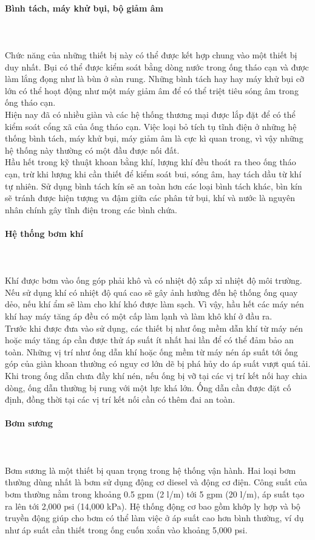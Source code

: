 \documentclass[12pt,a4paper]{article}
\newcommand{\subsubsubsection}[1]{\paragraph{#1}\mbox{}\\}
\begin{document}
\subsubsubsection{Bình tách, máy khử bụi, bộ giảm âm}\\
	Chức năng của những thiết bị này có thể được kết hợp chung vào một thiết bị duy nhất. Bụi có thể được kiểm soát bằng dòng nước trong ống tháo cạn và được làm lắng đọng như là bùn ở sàn rung. Những bình tách hay hay máy khử bụi cỡ lớn có thể hoạt động như một máy giảm âm để có thể triệt tiêu sóng âm trong ống tháo cạn.\\
	Hiện nay đã có nhiều giàn và các hệ thống thương mại được lắp đặt để có thể kiểm soát cổng xã của ống tháo cạn. Việc loại bỏ tích tụ tĩnh điện ở những hệ thống bình tách, máy khử bụi, máy giảm âm là cực kì quan trong, vì vậy những hệ thống này thường có một đầu được nối đất.\\
	Hầu hết trong kỹ thuật khoan bằng khí, lượng khí đều thoát ra theo ống tháo cạn, trừ khi lượng khi cần thiết để kiểm soát bui, sóng âm, hay tách dầu từ khí tự nhiên. Sử dụng bình tách kín sẽ an toàn hơn các loại bình tách khác, bìn kín sẽ tránh được hiện tượng va đậm giữa các phân tử bụi, khí và nước là nguyên nhân chính gây tĩnh điện trong các bình chứa.
\subsubsubsection{Hệ thống bơm khí}\\
	Khí được bơm vào ống góp phải khô và có nhiệt độ xấp xỉ nhiệt độ môi trường. Nếu sử dụng khí có nhiệt độ quá cao sẽ gây ảnh hưởng đến hệ thống ống quay dẻo, nếu khí ẩm sẽ làm cho khí khó được làm sạch. Vì vậy, hầu hết các máy nén khí hay máy tăng áp đều có một cấp làm lạnh và làm khô khí ở đầu ra.\\
	Trước khi được đưa vào sử dụng, các thiết bị như ống mềm dẫn khí từ máy nén hoặc máy tăng áp cần được thử áp suất ít nhất hai lần để có thể đảm bảo an toàn. Những vị trí như ống dẫn khí hoặc ống mềm từ máy nén áp suất tới ống góp của giàn khoan thường có nguy cơ lớn dẽ bị phá hủy do áp suất vượt quá tải. Khi trong ống dẫn chưa đầy khí nén, nếu ống bị vỡ tại các vị trí kết nối hay chia dòng, ống dẫn thường bị rung với một lực khá lớn. Ống dẫn cần được đặt cố định, đồng thời tại các vị trí kết nối cần có thêm đai an toàn.
\subsubsubsection{Bơm sương}\\
	Bơm sương là một thiết bị quan trọng trong hệ thống vận hành. Hai loại bơm thường dùng nhất là bơm sử dụng động cơ diesel và động cơ điện. Công suất của bơm thường nằm trong khoảng 0.5 gpm (2 l/m) tới 5 gpm (20 l/m), áp suất tạo ra lên tới 2,000 psi (14,000 kPa). Hệ thống động cơ bao gồm khớp ly hợp và bộ truyền động giúp cho bơm có thể làm việc ở áp suất cao hơn bình thường, ví dụ như áp suất cần thiết trong ống cuốn xoắn vào khoảng 5,000 psi.\\
\end{document}
